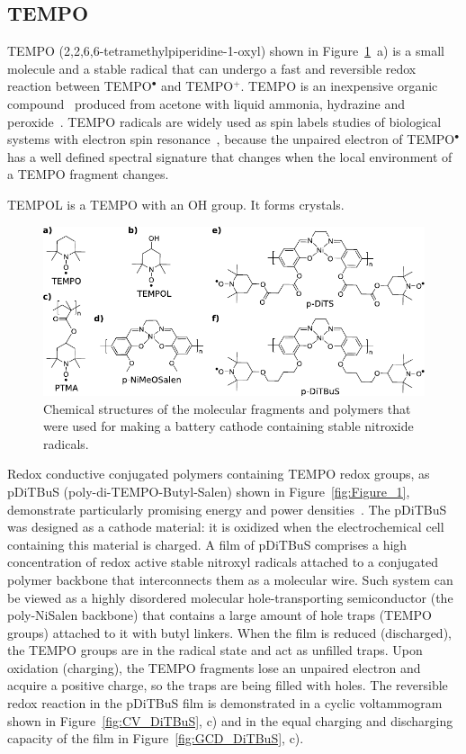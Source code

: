 \par
\subsection{TEMPO}
TEMPO (2,2,6,6-tetramethylpiperidine-1-oxyl) shown in Figure~\ref{fig:molecules}~a) is a small molecule and a stable radical that can undergo a fast and reversible redox reaction between TEMPO$^\bullet$ and TEMPO$^+$. TEMPO is an inexpensive organic compound~\cite{Vereshchagin2022} produced from acetone with liquid ammonia, hydrazine and peroxide~\cite{Casado_2021_book}. TEMPO radicals are widely used as spin labels studies of biological systems with electron spin resonance~\cite{Bordignon2017}, because the unpaired electron of TEMPO$^\bullet$ has a well defined spectral signature that changes when the local environment of a TEMPO fragment changes.

TEMPOL is a TEMPO with an OH group. It forms crystals.

\begin{figure}[h]
\center
	\includegraphics[width=1\textwidth]{./electrochemistry/figures/materials/molecules.pdf}
	\caption{Chemical structures of the molecular fragments and polymers that were used for making a battery cathode containing stable nitroxide radicals.}
	\label{fig:molecules}
\end{figure}



Redox conductive conjugated polymers containing TEMPO redox groups, as pDiTBuS (poly-di-TEMPO-Butyl-Salen) shown in Figure~\ref{fig:Figure_1}, demonstrate particularly promising energy and power densities~\cite{Vereshchagin2020}. The pDiTBuS was designed as a cathode material: it is oxidized when the electrochemical cell containing this material is charged. A film of pDiTBuS comprises a high concentration of redox active stable nitroxyl radicals attached to a conjugated polymer backbone that interconnects them as a molecular wire. Such system can be viewed as a highly disordered molecular hole-transporting semiconductor (the poly-NiSalen backbone) that contains a large amount of hole traps (TEMPO groups) attached to it with butyl linkers. When the film is reduced (discharged), the TEMPO groups are in the radical state and act as unfilled traps. Upon oxidation (charging), the TEMPO fragments lose an unpaired electron and acquire a positive charge, so the traps are being filled with holes. The reversible redox reaction in the pDiTBuS film is demonstrated in a cyclic voltammogram shown in Figure~\ref{fig:CV_DiTBuS}, c) and in the equal charging and discharging capacity of the film in Figure~\ref{fig:GCD_DiTBuS}, c).

